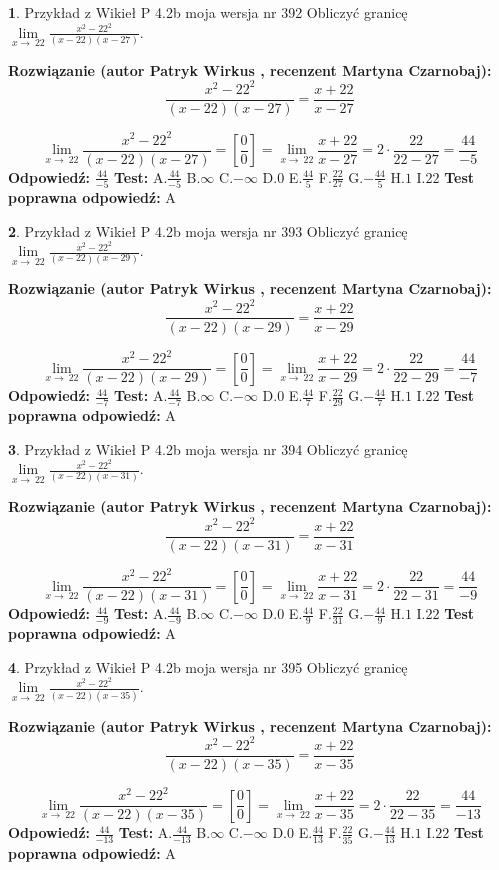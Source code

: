 \documentclass[12pt, a4paper]{article}
\theoremstyle{definition} %
\newtheorem{zad}{}
\newcommand{\zadStart}[1]{\begin{zad}#1\newline}
\newcommand{\zadStop}{\end{zad}}
\newcommand{\rozwStart}[2]{\noindent \textbf{Rozwiązanie (autor #1 , recenzent #2): }\newline}
\newcommand{\rozwStop}{\newline}
\newcommand{\odpStart}{\noindent \textbf{Odpowiedź:}\newline}
\newcommand{\odpStop}{\newline}
\newcommand{\testStart}{\noindent \textbf{Test:}\newline}
\newcommand{\testStop}{\newline}
\newcommand{\kluczStart}{\noindent \textbf{Test poprawna odpowiedź:}\newline}
\newcommand{\kluczStop}{\newline}
\begin{document}
\zadStart{Przykład z Wikieł P 4.2b moja wersja nr 392}
Obliczyć granicę $\lim\limits_{x\to\ 22}\frac{x^{2}-22^{2}}{(x-22)(x-27)}$.
\zadStop
\rozwStart{Patryk Wirkus}{Martyna Czarnobaj}
$$\frac{x^{2}-22^{2}}{(x-22)(x-27)}=\frac{x+22}{x-27}$$

$$\lim\limits_{x\to\ 22}\frac{x^{2}-22^{2}}{(x-22)(x-27)}=[\frac{0}{0}]=\lim\limits_{x\to\ 22}\frac{x+22}{x-27}=2 \cdot \frac{22}{22-27} = \frac{44}{-5}$$
\rozwStop
\odpStart
$\frac{44}{-5}$
\odpStop
\testStart
A.$\frac{44}{-5}$
B.$\infty$
C.$-\infty$
D.$0$
E.$\frac{44}{5}$
F.$\frac{22}{27}$
G.$-\frac{44}{5}$
H.$1$
I.$22$
\testStop
\kluczStart
A
\kluczStop



\zadStart{Przykład z Wikieł P 4.2b moja wersja nr 393}
Obliczyć granicę $\lim\limits_{x\to\ 22}\frac{x^{2}-22^{2}}{(x-22)(x-29)}$.
\zadStop
\rozwStart{Patryk Wirkus}{Martyna Czarnobaj}
$$\frac{x^{2}-22^{2}}{(x-22)(x-29)}=\frac{x+22}{x-29}$$

$$\lim\limits_{x\to\ 22}\frac{x^{2}-22^{2}}{(x-22)(x-29)}=[\frac{0}{0}]=\lim\limits_{x\to\ 22}\frac{x+22}{x-29}=2 \cdot \frac{22}{22-29} = \frac{44}{-7}$$
\rozwStop
\odpStart
$\frac{44}{-7}$
\odpStop
\testStart
A.$\frac{44}{-7}$
B.$\infty$
C.$-\infty$
D.$0$
E.$\frac{44}{7}$
F.$\frac{22}{29}$
G.$-\frac{44}{7}$
H.$1$
I.$22$
\testStop
\kluczStart
A
\kluczStop



\zadStart{Przykład z Wikieł P 4.2b moja wersja nr 394}
Obliczyć granicę $\lim\limits_{x\to\ 22}\frac{x^{2}-22^{2}}{(x-22)(x-31)}$.
\zadStop
\rozwStart{Patryk Wirkus}{Martyna Czarnobaj}
$$\frac{x^{2}-22^{2}}{(x-22)(x-31)}=\frac{x+22}{x-31}$$

$$\lim\limits_{x\to\ 22}\frac{x^{2}-22^{2}}{(x-22)(x-31)}=[\frac{0}{0}]=\lim\limits_{x\to\ 22}\frac{x+22}{x-31}=2 \cdot \frac{22}{22-31} = \frac{44}{-9}$$
\rozwStop
\odpStart
$\frac{44}{-9}$
\odpStop
\testStart
A.$\frac{44}{-9}$
B.$\infty$
C.$-\infty$
D.$0$
E.$\frac{44}{9}$
F.$\frac{22}{31}$
G.$-\frac{44}{9}$
H.$1$
I.$22$
\testStop
\kluczStart
A
\kluczStop



\zadStart{Przykład z Wikieł P 4.2b moja wersja nr 395}
Obliczyć granicę $\lim\limits_{x\to\ 22}\frac{x^{2}-22^{2}}{(x-22)(x-35)}$.
\zadStop
\rozwStart{Patryk Wirkus}{Martyna Czarnobaj}
$$\frac{x^{2}-22^{2}}{(x-22)(x-35)}=\frac{x+22}{x-35}$$

$$\lim\limits_{x\to\ 22}\frac{x^{2}-22^{2}}{(x-22)(x-35)}=[\frac{0}{0}]=\lim\limits_{x\to\ 22}\frac{x+22}{x-35}=2 \cdot \frac{22}{22-35} = \frac{44}{-13}$$
\rozwStop
\odpStart
$\frac{44}{-13}$
\odpStop
\testStart
A.$\frac{44}{-13}$
B.$\infty$
C.$-\infty$
D.$0$
E.$\frac{44}{13}$
F.$\frac{22}{35}$
G.$-\frac{44}{13}$
H.$1$
I.$22$
\testStop
\kluczStart
A
\kluczStop
\end{document}
